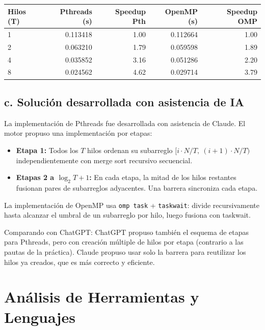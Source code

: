 \documentclass[11pt,a4paper]{article}
\begin{document}
\begin{center}
\begin{tabular}{|l|r|r|r|r|}
\hline
\textbf{Hilos (T)} & \textbf{Pthreads (s)} & \textbf{Speedup Pth} & \textbf{OpenMP (s)} & \textbf{Speedup OMP} \\
\hline
1 & 0.113418 & 1.00 & 0.112664 & 1.00 \\
2 & 0.063210 & 1.79 & 0.059598 & 1.89 \\
4 & 0.035852 & 3.16 & 0.051286 & 2.20 \\
8 & 0.024562 & 4.62 & 0.029714 & 3.79 \\
\hline
\end{tabular}
\end{center}

\subsection*{c. Solución desarrollada con asistencia de IA}

La implementación de Pthreads fue desarrollada con asistencia de Claude. El motor propuso una implementación por etapas:
\begin{itemize}
    \item \textbf{Etapa 1:} Todos los $T$ hilos ordenan su subarreglo $[i \cdot N/T,\ (i+1) \cdot N/T)$ independientemente con merge sort recursivo secuencial.
    \item \textbf{Etapas 2 a $\log_2 T + 1$:} En cada etapa, la mitad de los hilos restantes fusionan pares de subarreglos adyacentes. Una barrera sincroniza cada etapa.
\end{itemize}

La implementación de OpenMP usa \texttt{omp task} + \texttt{taskwait}: divide recursivamente hasta alcanzar el umbral de un subarreglo por hilo, luego fusiona con taskwait.

Comparando con ChatGPT: ChatGPT propuso también el esquema de etapas para Pthreads, pero con creación múltiple de hilos por etapa (contrario a las pautas de la práctica). Claude propuso usar solo la barrera para reutilizar los hilos ya creados, que es más correcto y eficiente.

\newpage

\section{Análisis de Herramientas y Lenguajes}
\end{document}
